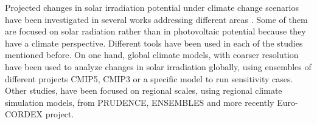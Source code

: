 



Projected changes in solar irradiation potential under climate change scenarios have been investigated in several works addressing different areas \cite*{Bartok2010, Crook2011, Gaetani2014, Wild2015,Jerez2015}. Some of them are focused on solar radiation rather than in photovoltaic potential because they have a climate perspective. Different tools have been used in each of the studies mentioned before. On one hand, global climate models, with coarser resolution have been used to analyze changes in solar irradiation globally, using ensembles of different projects CMIP5, CMIP3 or a specific model to run sensitivity cases. Other studies, have been focused on regional scales, using regional climate simulation models, from PRUDENCE, ENSEMBLES and more recently Euro-CORDEX project.

